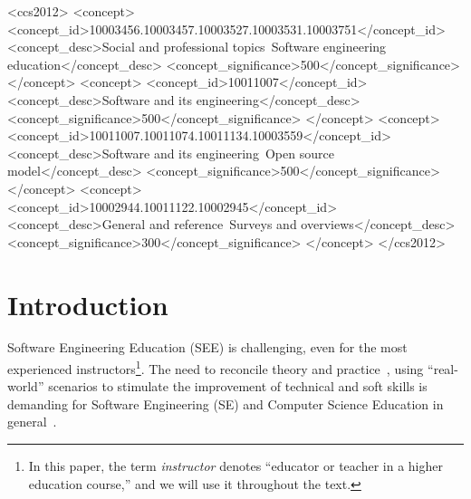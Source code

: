 \documentclass[sigconf]{acmart}
\begin{document}

\begin{CCSXML}
<ccs2012>
<concept>
<concept_id>10003456.10003457.10003527.10003531.10003751</concept_id>
<concept_desc>Social and professional topics~Software engineering education</concept_desc>
<concept_significance>500</concept_significance>
</concept>
<concept>
<concept_id>10011007</concept_id>
<concept_desc>Software and its engineering</concept_desc>
<concept_significance>500</concept_significance>
</concept>
<concept>
<concept_id>10011007.10011074.10011134.10003559</concept_id>
<concept_desc>Software and its engineering~Open source model</concept_desc>
<concept_significance>500</concept_significance>
</concept>
<concept>
<concept_id>10002944.10011122.10002945</concept_id>
<concept_desc>General and reference~Surveys and overviews</concept_desc>
<concept_significance>300</concept_significance>
</concept>
</ccs2012>
\end{CCSXML}


 
 \maketitle

\section{Introduction}

Software Engineering Education (SEE) is challenging, even for the most experienced instructors\footnote{In this paper, the term \textit{instructor} denotes ``educator or teacher in a higher education course,'' and we will use it throughout the text.}. 
The need to reconcile theory and practice~\cite{Liguo:Book:2014,feliciano:2016,garousi2019closing, nascimento:oss:2019}, using ``real-world'' scenarios to stimulate the improvement of technical and soft skills 
is demanding for Software Engineering (SE) and Computer Science Education in general~\cite{spinellis:acm:2021}.
\end{document}
